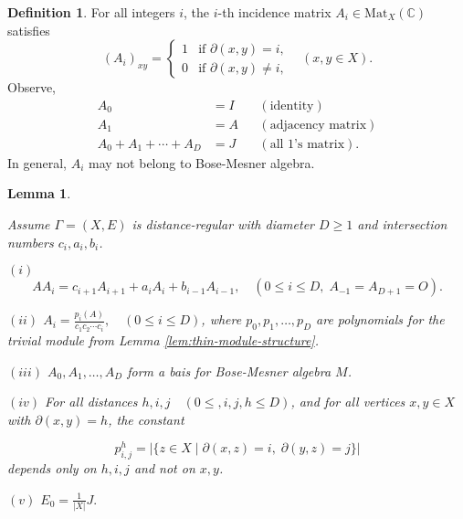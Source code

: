 \documentclass[
]{book}
\newtheorem{lemma}{Lemma}[chapter]
\theoremstyle{definition}
\newtheorem{definition}{Definition}[chapter]
\theoremstyle{definition}
\theoremstyle{definition}
\theoremstyle{definition}
\theoremstyle{remark}
\begin{document}
\begin{definition}
\protect\hypertarget{def:ith-incidence}{}\label{def:ith-incidence}For all integers \(i\), the \(i\)-th incidence matrix \(A_i\in \mathrm{Mat}_X(\mathbb{C})\) satisfies
\[(A_i)_{xy} = \begin{cases} 1 & \text{if $\partial(x,y) = i$,}\\
0 & \text{if $\partial(x,y)\neq i$,}
\end{cases} \quad (x,y\in X).\]
Observe,
\begin{align}
A_0 & = I && (\text{identity})\\
A_1 & = A && (\text{adjacency matrix})\\
A_0 + A_1 + \cdots + A_D & = J && (\text{all 1's matrix}).
\end{align}
In general, \(A_i\) may not belong to Bose-Mesner algebra.
\end{definition}

\begin{lemma}
\protect\hypertarget{lem:incidence-matrices}{}\label{lem:incidence-matrices}

Assume \(\Gamma = (X, E)\) is distance-regular with diameter \(D\geq 1\) and intersection numbers \(c_i, a_i, b_i\).

\((i)\) \[AA_i = c_{i+1}A_{i+1} + a_iA_i + b_{i-1}A_{i-1}, \quad (0\leq i\leq D, \; A_{-1} = A_{D+1} = O).\]

\((ii)\) \({\displaystyle A_i = \frac{p_i(A)}{c_1c_2\cdots c_i}, \quad (0\leq i\leq D)}\), where \(p_0, p_1, \ldots, p_D\) are polynomials for the trivial module from Lemma \ref{lem:thin-module-structure}.

\((iii)\) \(A_0, A_1, \ldots, A_D\) form a bais for Bose-Mesner algebra \(M\).

\((iv)\) For all distances \(h, i, j \quad (0\leq, i, j, h\leq D)\), and for all vertices \(x, y\in X\) with \(\partial(x,y) = h\), the constant

\[p^h_{i,j} = |\{z\in X\mid \partial(x,z) = i, \; \partial(y,z) = j\}|\]
depends only on \(h, i, j\) and not on \(x, y\).

\((v)\) \({\displaystyle E_0 = \frac{1}{|X|}J.}\)

\end{lemma}
\end{document}
